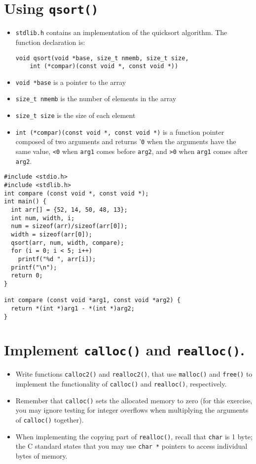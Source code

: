 \documentclass{article}
\begin{document}
\section{Using \texttt{qsort()}}
\begin{itemize}
\item \verb!stdlib.h! contains an implementation of the quicksort algorithm. The function declaration is:
\begin{verbatim}
void qsort(void *base, size_t nmemb, size_t size,
    int (*compar)(const void *, const void *)) 
\end{verbatim}
\item \verb!void *base! is a pointer to the array
\item \verb!size_t nmemb! is the number of elements in the array
\item \verb!size_t size! is the size of each element
\item \verb!int (*compar)(const void *, const void *)! is a function pointer composed of two arguments and returns '\verb!0! when the arguments have the same value, \verb!<0! when \verb!arg1! comes before \verb!arg2!, and \verb!>0! when \verb!arg1! comes after \verb!arg2!.
\end{itemize}



\begin{verbatim}
#include <stdio.h>
#include <stdlib.h>
int compare (const void *, const void *); 
int main() {
  int arr[] = {52, 14, 50, 48, 13};
  int num, width, i;
  num = sizeof(arr)/sizeof(arr[0]);
  width = sizeof(arr[0]);
  qsort(arr, num, width, compare);
  for (i = 0; i < 5; i++)
    printf("%d ", arr[i]);
  printf("\n");
  return 0;
}

int compare (const void *arg1, const void *arg2) {
  return *(int *)arg1 - *(int *)arg2;
}
\end{verbatim}




\section{Implement \texttt{calloc()} and \texttt{realloc()}.}
\begin{itemize}
\item Write functions \verb!calloc2()! and \verb!realloc2()!, that use \verb!malloc()! and \verb!free()! to implement the functionality of \verb!calloc()! and \verb!realloc()!, respectively.
\item Remember that \verb!calloc()! sets the allocated memory to zero (for this exercise, you may ignore testing for integer overflows when multiplying the arguments of \verb!calloc()! together).
\item When implementing the copying part of \verb!realloc()!, recall that \verb!char! is 1 byte; the C standard states that you may use \verb!char *! pointers to access individual bytes of memory.
\end{itemize}
\end{document}

